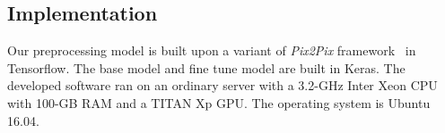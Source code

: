 \subsection{Implementation}
Our preprocessing model is built upon a variant of \emph{Pix2Pix} framework~\cite{Pix2PixCode} in Tensorflow. The base model and fine tune model are built in Keras. The developed software ran on an ordinary server with a 3.2-GHz Inter Xeon CPU with 100-GB RAM and a TITAN Xp GPU. The operating system is Ubuntu 16.04.


